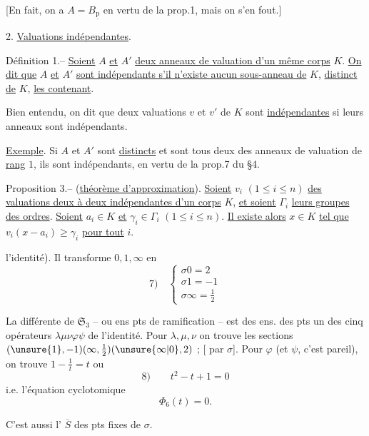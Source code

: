 [En fait, on a $A=B_{\underline{\mathrm p}}$ en vertu de la prop.1, mais on s'en fout.]

2. \uline{Valuations indépendantes}.

Définition 1.-- \uline{Soient} $A$ \uline{et} $A'$ \uline{deux anneaux de valuation d'un même corps} $K$. \uline{On dit que} $A$ \uline{et} $A'$ \uline{sont indépendants s'il n'existe aucun sous-anneau de} $K$, \uline{distinct de} $K$, \uline{les contenant}.

Bien entendu, on dit que deux valuations $v$ et $v'$ de $K$ sont \uline{indépendantes} si leurs anneaux sont indépendants.

\uline{Exemple}. Si $A$ et $A'$ sont \uline{distincts} et sont tous deux des anneaux de valuation de \uline{rang} $1$, ils sont indépendants, en vertu de la prop.7 du \S4.

Proposition 3.-- (\uline{théorème d'approximation}). \uline{Soient} $v_i$ $(1\leqslant i\leqslant n)$ \uline{des valuations deux à deux indépendantes d'un corps} $K$, \uline{et soient} $\Gamma_i$ \uline{leurs groupes des ordres}. \uline{Soient} $a_i\in K$ \uline{et} $\gamma_i\in\Gamma_i$ $(1\leqslant i\leqslant n)$. \uline{Il existe alors} $x\in K$ \uline{tel que} $v_i(x-a_i)\geqslant\gamma_i$ \uline{pour tout} $i$.


l'identité). Il transforme $0,1,\infty$ en
\[
7)\quad\left\{\begin{array}{l}\sigma0=2\\\sigma1=-1\\\sigma\infty=\tfrac12\end{array}\right.
\]

La différente de $\mathfrak S_3$ -- ou ens pts de ramification -- est  des ens. des pts  un des cinq opérateurs $\lambda\mu\nu\varphi\psi$  de l'identité. Pour $\lambda,\mu,\nu$ on trouve les sections $(\unsure{1},-1)(\infty,\tfrac12)(\unsure{\infty|0},2)$ ; [ par $\sigma$]. Pour $\varphi$ (et $\psi$, c'est pareil), on trouve $1-\frac1t=t$ ou
\[
8)\qquad t^2-t+1=0
\]
i.e. l'équation cyclotomique
\[
\boxed{\Phi_6(t)=0}.
\]


C'est aussi l' $\overline S$ des pts fixes de $\sigma$.

